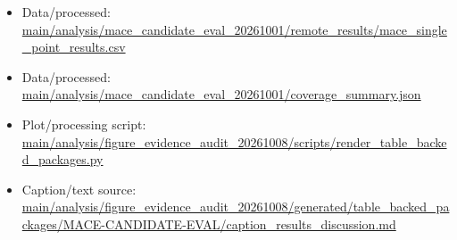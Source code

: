 \begin{itemize}[leftmargin=1.4em,noitemsep]
\item Data/processed: \begingroup\scriptsize\url{main/analysis/mace_candidate_eval_20261001/remote_results/mace_single_point_results.csv}\endgroup
\item Data/processed: \begingroup\scriptsize\url{main/analysis/mace_candidate_eval_20261001/coverage_summary.json}\endgroup
\item Plot/processing script: \begingroup\scriptsize\url{main/analysis/figure_evidence_audit_20261008/scripts/render_table_backed_packages.py}\endgroup
\item Caption/text source: \begingroup\scriptsize\url{main/analysis/figure_evidence_audit_20261008/generated/table_backed_packages/MACE-CANDIDATE-EVAL/caption_results_discussion.md}\endgroup
\end{itemize}
